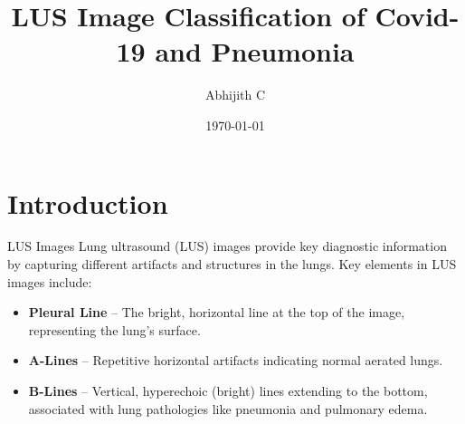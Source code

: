 \documentclass{beamer}
\title{LUS Image Classification of Covid-19 and Pneumonia}
\author{Abhijith C}
\date{\today}
\begin{document}
\maketitle

\section{Introduction}
\begin{frame}{LUS Images}
        Lung ultrasound (LUS) images provide key diagnostic information by capturing different artifacts and structures in the lungs. Key elements in LUS images include:
\begin{itemize}
        \item \textbf{Pleural Line} – The bright, horizontal line at the top of the image, representing the lung’s surface.
        \item \textbf{A-Lines} – Repetitive horizontal artifacts indicating normal aerated lungs.
        \item \textbf{B-Lines} – Vertical, hyperechoic (bright) lines extending to the bottom, associated with lung pathologies like pneumonia and pulmonary edema.
    \end{itemize}
    
\end{frame}
\end{document}
